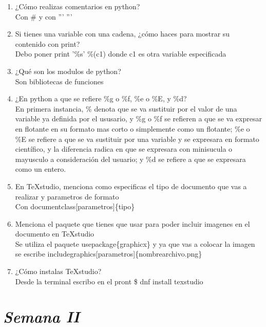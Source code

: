 \documentclass{book}
\begin{document}
\begin{enumerate}
	\item ¿Cómo realizas comentarios en python?\\
	Con \# y con '''  '''
	\item Si tienes una variable con una cadena, ¿cómo haces para mostrar su contenido con print?\\
	Debo poner print '\%s' \%(c1) donde c1 es otra variable especificada
	\item ¿Qué son los modulos de python?\\
	Son bibliotecas de funciones
	\item ¿En python a que se refiere \%g o  \%f, \%e o \%E, y \%d?\\
	En primera instancia, \% denota que se va sustituir por el valor de una variable ya definida por el ususario, y \%g o  \%f se refieren a que se va expresar en flotante en su formato mas corto o simplemente como un flotante; \%e o \%E se refiere a que se va sustituir por una variable y se expresara en formato científico, y la diferencia radica en que se expresara con minisucula o mayusculo a consideración del usuario; y \%d se refiere a que se expresara como un entero.
	\item En TeXstudio, menciona como especificas el tipo de documento que vas a realizar y parametros de formato\\
	Con documentclass[parametros]\{tipo\}
	\item Menciona el paquete que tienes que usar para poder incluir imagenes en el documento en TeXstudio\\
	Se utiliza el paquete usepackage\{graphicx\} y ya que vas a colocar la imagen se escribe includegraphics[parametros]\{nombrearchivo.png\}
	\item ¿Cómo instalas TeXstudio?\\
	Desde la terminal escribo en el pront \$ dnf install texstudio
	
	
	
	
\end{enumerate}%



\section{\textit{Semana II}}%
\end{document}
